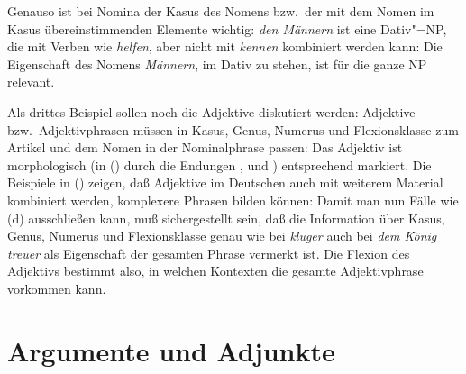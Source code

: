 Genauso ist bei Nomina der Kasus des Nomens bzw.\ der mit dem Nomen im Kasus übereinstimmenden
Elemente wichtig: \emph{den Männern} ist eine Dativ"=NP, die mit Verben wie \emph{helfen}, aber
nicht mit \emph{kennen} kombiniert werden kann:
\eal
{}
\zl
Die Eigenschaft des Nomens \emph{Männern}, im Dativ zu stehen, ist für die ganze NP relevant.

Als drittes Beispiel sollen noch die Adjektive diskutiert werden: Adjektive bzw.\ Adjektivphrasen
müssen in Kasus, Genus, Numerus und Flexionsklasse zum Artikel und dem Nomen in der Nominalphrase
passen:
\eal
{}
\zl
Das Adjektiv ist morphologisch (in () durch die Endungen ,  und
) entsprechend markiert. Die Beispiele in () zeigen, daß Adjektive im Deutschen
auch mit weiterem Material kombiniert werden, \dash komplexere Phrasen bilden können:
\eal
{}
\zl
Damit man nun Fälle wie (d) ausschließen kann, muß sichergestellt sein, daß die Information
über Kasus, Genus, Numerus und Flexionsklasse genau wie bei \emph{kluger} auch bei \emph{dem König
treuer} als Eigenschaft der gesamten Phrase vermerkt ist. Die Flexion des Adjektivs bestimmt also, in welchen Kontexten
die gesamte Adjektivphrase vorkommen kann.



\section{Argumente und Adjunkte}
\label{sec-intro-arg-adj}

